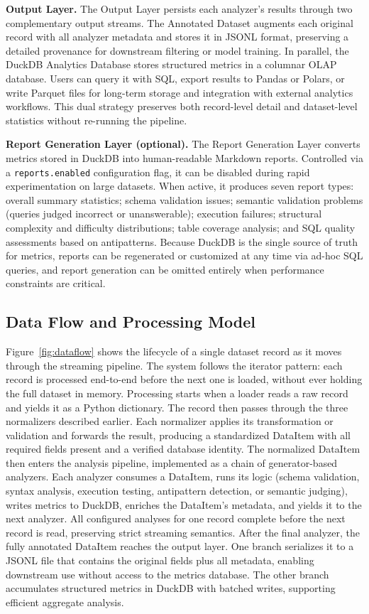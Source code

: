\documentclass[]{einformatica}
\begin{document}
\textbf{Output Layer.} The Output Layer persists each analyzer's results through two complementary output streams. The Annotated Dataset augments each original record with all analyzer metadata and stores it in JSONL format, preserving a detailed provenance for downstream filtering or model training. In parallel, the DuckDB Analytics Database stores structured metrics in a columnar OLAP database. Users can query it with SQL, export results to Pandas or Polars, or write Parquet files for long-term storage and integration with external analytics workflows. This dual strategy preserves both record-level detail and dataset-level statistics without re-running the pipeline.

\textbf{Report Generation Layer (optional).} The Report Generation Layer converts metrics stored in DuckDB into human-readable Markdown reports. Controlled via a \texttt{reports.enabled} configuration flag, it can be disabled during rapid experimentation on large datasets. When active, it produces seven report types: overall summary statistics; schema validation issues; semantic validation problems (queries judged incorrect or unanswerable); execution failures; structural complexity and difficulty distributions; table coverage analysis; and SQL quality assessments based on antipatterns. Because DuckDB is the single source of truth for metrics, reports can be regenerated or customized at any time via ad-hoc SQL queries, and report generation can be omitted entirely when performance constraints are critical.

\subsection{Data Flow and Processing Model}

Figure~\ref{fig:dataflow} shows the lifecycle of a single dataset record as it moves through the streaming pipeline. The system follows the iterator pattern: each record is processed end-to-end before the next one is loaded, without ever holding the full dataset in memory. Processing starts when a loader reads a raw record and yields it as a Python dictionary. The record then passes through the three normalizers described earlier. Each normalizer applies its transformation or validation and forwards the result, producing a standardized DataItem with all required fields present and a verified database identity. The normalized DataItem then enters the analysis pipeline, implemented as a chain of generator-based analyzers. Each analyzer consumes a DataItem, runs its logic (schema validation, syntax analysis, execution testing, antipattern detection, or semantic judging), writes metrics to DuckDB, enriches the DataItem's metadata, and yields it to the next analyzer. All configured analyses for one record complete before the next record is read, preserving strict streaming semantics. After the final analyzer, the fully annotated DataItem reaches the output layer. One branch serializes it to a JSONL file that contains the original fields plus all metadata, enabling downstream use without access to the metrics database. The other branch accumulates structured metrics in DuckDB with batched writes, supporting efficient aggregate analysis.
\end{document}
